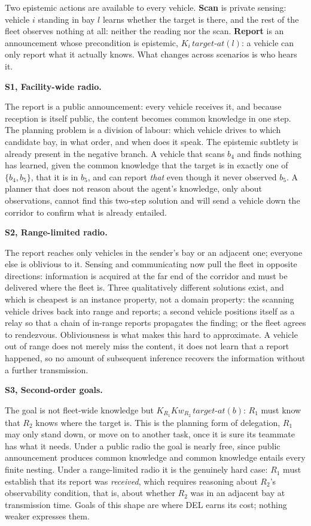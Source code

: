\documentclass[11pt,a4paper]{article}
\theoremstyle{definition}
\newcommand{\Kop}[1]{K_{#1}}
\newcommand{\Kw}[1]{\mathit{Kw}_{#1}}
\newcommand{\scenariohead}[1]{\vspace{2pt}\noindent\textcolor{steel}{\bfseries #1}\par\vspace{1pt}}
\begin{document}
Two epistemic actions are available to every vehicle. \textbf{Scan} is private
sensing: vehicle $i$ standing in bay $l$ learns whether the target is there,
and the rest of the fleet observes nothing at all: neither the reading nor
the scan.
\textbf{Report} is an announcement whose precondition is epistemic,
$\Kop{i}\,\mathit{target\text{-}at}(l)$: a vehicle can only report what it
actually knows. What changes across scenarios is who hears it.

\scenariohead{S1, Facility-wide radio.}
The report is a public announcement: every vehicle receives it, and because
reception is itself public, the content becomes common knowledge in one step.
The planning problem is a division of labour: which vehicle drives to which
candidate bay, in what order, and when does it speak. The epistemic subtlety
is already present in the negative branch. A vehicle that scans $b_4$ and finds
nothing has learned, given the common knowledge that the target is in exactly
one of $\{b_4,b_5\}$, that it is in $b_5$, and can report \emph{that} even
though it never observed $b_5$. A planner that does not reason about the agent's
knowledge, only about observations, cannot find this two-step solution and will
send a vehicle down the corridor to confirm what is already entailed.

\scenariohead{S2, Range-limited radio.}
The report reaches only vehicles in the sender's bay or an adjacent one;
everyone else is oblivious to it. Sensing and communicating now pull the fleet
in opposite directions: information is acquired at the far end of the corridor
and must be delivered where the fleet is. Three qualitatively different
solutions exist, and which is cheapest is an instance property, not a domain
property: the scanning vehicle drives back into range and reports; a second
vehicle positions itself as a relay so that a chain of in-range reports
propagates the finding; or the fleet agrees to rendezvous. Obliviousness is
what makes this hard to approximate. A vehicle out of range does not merely
miss the content, it does not learn that a report happened, so no amount of
subsequent inference recovers the information without a further transmission.

\scenariohead{S3, Second-order goals.}
The goal is not fleet-wide knowledge but $\Kop{R_1}\Kw{R_2}\,\mathit{target
\text{-}at}(b)$: $R_1$ must know that $R_2$ knows where the target is. This is
the planning form of delegation, $R_1$ may only stand down, or move on to
another task, once it is sure its teammate has what it needs. Under a public
radio the goal is nearly free, since public announcement produces common
knowledge and common knowledge entails every finite nesting. Under a
range-limited radio it is the genuinely hard case: $R_1$ must establish that
its report was \emph{received}, which requires reasoning about $R_2$'s
observability condition, that is, about whether $R_2$ was in an adjacent bay
at transmission time. Goals of this shape are where DEL earns its cost;
nothing weaker expresses them.
\end{document}
